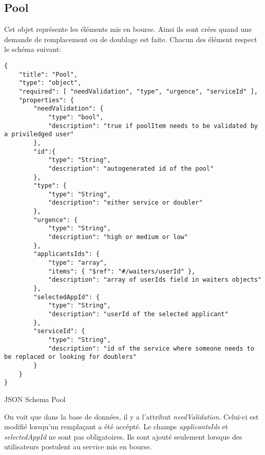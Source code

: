\subsection*{Pool}
Cet objet représente les éléments mis en bourse. Ainsi ils sont crées quand une demande de remplacement ou de doublage est faite. Chacun des élément respect le schéma suivant:
\begin{listing}[!h]
\begin{verbatim}
{
    "title": "Pool",
    "type": "object",
    "required": [ "needValidation", "type", "urgence", "serviceId" ],
    "properties": {
        "needValidation": {
            "type": "bool",
            "description": "true if poolItem needs to be validated by a priviledged user"
        },
        "id":{
            "type": "String",
            "description": "autogenerated id of the pool"
        },
        "type": {
            "type": "String",
            "description": "either service or doubler"
        },
        "urgence": {
            "type": "String",
            "description": "high or medium or low"
        },
        "applicantsIds": {
            "type": "array",
            "items": { "$ref": "#/waiters/userId" },
            "description": "array of userIds field in waiters objects"
        },
        "selectedAppId": {
            "type": "String",
            "description": "userId of the selected applicant"
        },
        "serviceId": {
            "type": "String",
            "description": "id of the service where someone needs to be replaced or looking for doublers"
        }
    }
}
\end{verbatim}
\caption{JSON Schema Pool}
\label{schema:services}
\end{listing}

On voit que dans la base de données, il y a l'attribut \textit{needValidation}. Celui-ci est modifié lorsqu'un remplaçant a été accépté. Le champs \textit{applicantsIds} et \textit{selectedAppId} ne sont pas obligatoires. Ils sont ajouté seulement lorsque des utilisateurs postulent au service mis en bourse.

